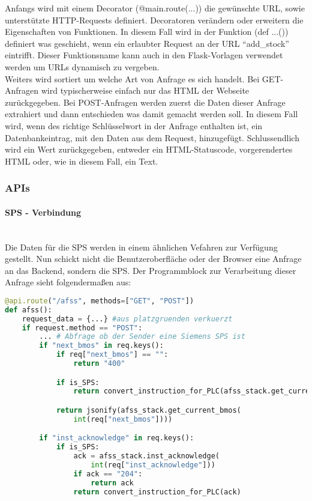Anfangs wird mit einem Decorator (@main.route(...)) die gewünschte URL, sowie unterstützte HTTP-Requests definiert. Decoratoren verändern oder erweitern die Eigenschaften von Funktionen. In diesem Fall wird in der Funktion (def ...()) definiert was geschieht, wenn ein erlaubter Request an der URL \enquote{add\_stock} eintrifft. Dieser Funktionsname kann auch in den Flask-Vorlagen verwendet werden um URLs dynamisch zu vergeben.\\
Weiters wird sortiert um welche Art von Anfrage es sich handelt. Bei GET-Anfragen wird typischerweise einfach nur das HTML der Webseite zurückgegeben. Bei POST-Anfragen werden zuerst die Daten dieser Anfrage extrahiert und dann entschieden was damit gemacht werden soll. In diesem Fall wird, wenn des richtige Schlüsselwort in der Anfrage enthalten ist, ein Datenbankeintrag, mit den Daten aus dem Request, hinzugefügt. Schlussendlich wird ein Wert zurückgegeben, entweder ein HTML-Statuscode, vorgerendertes HTML oder, wie in diesem Fall, ein Text.

\subsubsection{APIs}

\paragraph{SPS - Verbindung}\mbox{}\\
Die Daten für die SPS werden in einem ähnlichen Vefahren zur Verfügung gestellt. Nun schickt nicht die Benutzeroberfläche oder der Browser eine Anfrage an das Backend, sondern die SPS. Der Programmblock zur Verarbeitung dieser Anfrage sieht folgendermaßen aus:

\begin{lstlisting}[language=Python, caption={Schnittstelle für die SPS}]
@api.route("/afss", methods=["GET", "POST"])
def afss():   
    request_data = {...} #aus platzgruenden verkuerzt
    if request.method == "POST":
        ... # Abfrage ob der Sender eine Siemens SPS ist
        if "next_bmos" in req.keys():
            if req["next_bmos"] == "":
                return "400"

            if is_SPS:
                return convert_instruction_for_PLC(afss_stack.get_current_bmos(int(req["next_bmos"])))

            return jsonify(afss_stack.get_current_bmos(
                int(req["next_bmos"])))

        if "inst_acknowledge" in req.keys():
            if is_SPS:
                ack = afss_stack.inst_acknowledge(
                    int(req["inst_acknowledge"]))
                if ack == "204":
                    return ack
                return convert_instruction_for_PLC(ack)
\end{lstlisting}  

